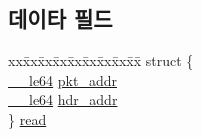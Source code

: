 \subsection*{데이타 필드}
\begin{DoxyCompactItemize}
\item 
\begin{tabbing}
xx\=xx\=xx\=xx\=xx\=xx\=xx\=xx\=xx\=\kill
struct \{\\
\>\hyperlink{lib_2igb_2e1000__osdep_8h_a082a2c540152aca8c135a709aa7d228f}{\_\_le64} \hyperlink{unione1000__adv__rx__desc_ac260c56b31b07a2c96981d6612f1a4c2}{pkt\_addr}\\
\>\hyperlink{lib_2igb_2e1000__osdep_8h_a082a2c540152aca8c135a709aa7d228f}{\_\_le64} \hyperlink{unione1000__adv__rx__desc_a773bb72f266b15112bc68a5718a5957d}{hdr\_addr}\\
\} \hyperlink{unione1000__adv__rx__desc_a749e71ccb083af11bad0fec38094928e}{read}\\


\end{tabbing}
\end{DoxyCompactItemize}

